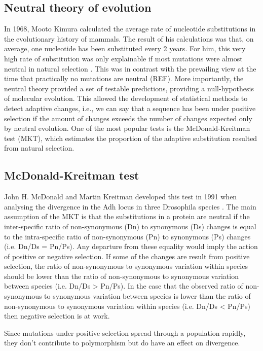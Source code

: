 \subsection{Neutral theory of evolution}
In 1968, Mooto Kimura calculated the average rate of nucleotide substitutions in the evolutionary history of mammals.
The result of his calculations was that, on average, one nucleotide has been substituted every 2 years.
For him, this very high rate of substitution was only explainable if most mutations were almost neutral in natural selection 
	\citep{Kimura1968}.
This was in contrast with the prevailing view at the time that practically no mutations are neutral (REF).
More importantly, the neutral theory provided a set of testable predictions, providing a null-hypothesis of molecular evolution.
This allowed the development of statistical methods to detect adaptive changes, i.e., we can say that a sequence has been under positive selection if the amount of changes exceeds the number of changes expected only by neutral evolution.
One of the most popular tests is the McDonald-Kreitman test (MKT),
which estimates the proportion of the adaptive substitution resulted from natural selection.

\subsection{McDonald-Kreitman test}
John H. McDonald and Martin Kreitman developed this test in 1991 when analysing the divergence in the Adh 
locus in three Drosophila species
	\citep{McDonald1991}.
The main assumption of the MKT is that the substitutions in a protein are neutral if the 
inter-specific ratio of non-synonymous (Dn) to synonymous (Ds) changes is equal to the 
intra-specific ratio of non-synonymous (Pn) to synonymous (Ps) changes (i.e. Dn/Ds = Pn/Ps).
Any departure from these equality would imply the action of positive or negative selection.
If some of the changes are result from positive selection, the ratio of non-synonymous to synonymous variation within species should be lower than the ratio of non-synonymous to synonymous variation between species (i.e. Dn/Ds > Pn/Ps). 
In the case that the observed ratio of non-synonymous to synonymous variation between species is lower than the ratio of non-synonymous to synonymous variation within species (i.e. Dn/Ds < Pn/Ps) 
then negative selection is at work.

Since mutations under positive selection spread through a population rapidly, they don't contribute to polymorphism but do have an effect on divergence.

